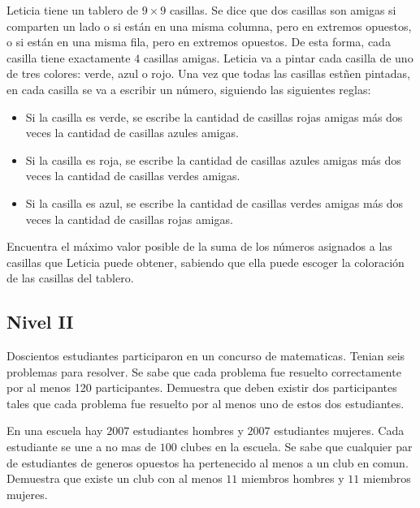 \documentclass[11pt]{scrartcl}
\begin{document}
\begin{problem} %
    
    Leticia tiene un tablero de $9\times 9$ casillas. Se dice que dos casillas son amigas si comparten un lado o si están en una misma columna, pero en extremos opuestos, o si están en una misma fila, pero en extremos opuestos. De esta forma, cada casilla tiene exactamente $4$ casillas amigas. Leticia va a pintar cada casilla de uno de tres colores: verde, azul o rojo. Una vez que todas las casillas estñen pintadas, en cada casilla se va a escribir un número, siguiendo las siguientes reglas:
 \begin{itemize} 
 \item  Si la casilla es verde, se escribe la cantidad de casillas rojas amigas más dos veces la cantidad de casillas azules amigas.
 \item  Si la casilla es roja, se escribe la cantidad de casillas azules amigas más dos veces la cantidad de casillas verdes amigas.
 \item  Si la casilla es azul, se escribe la cantidad de casillas verdes amigas más dos veces la cantidad de casillas rojas amigas.
 \end{itemize} 
Encuentra el máximo valor posible de la suma de los números asignados a las casillas que Leticia puede obtener, sabiendo que ella puede escoger la coloración de las casillas del tablero.

    
\end{problem}

\subsection{Nivel II}

\begin{problem} %
    Doscientos estudiantes participaron en un concurso de matematicas. Tenian seis problemas para resolver. Se sabe que cada problema fue resuelto correctamente por al menos 120 participantes. Demuestra que deben existir dos participantes tales que cada problema fue resuelto por al menos uno de estos dos estudiantes.
\end{problem}

\begin{problem} %
    En una escuela hay $2007$ estudiantes hombres y $2007$ estudiantes mujeres. Cada estudiante se une a no mas de $100$ clubes en la escuela. Se sabe que cualquier par de estudiantes de generos opuestos ha pertenecido al menos a un club en comun. Demuestra que existe un club con al menos $11$ miembros hombres y $11$ miembros mujeres.
\end{problem}
\end{document}
